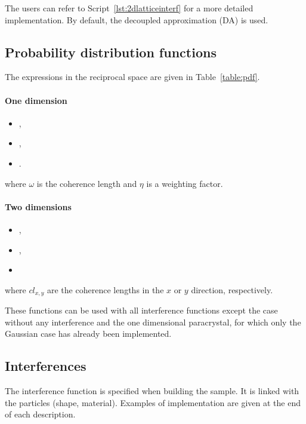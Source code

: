 The users can refer to Script~\ref{lst:2dlatticeinterf} for a more detailed implementation. By default, the decoupled approximation (DA) is used.

\subsection{Probability distribution functions}\label{baftd}
The expressions in the reciprocal space are given in Table~\ref{table:pdf}.

\paragraph{One dimension}
\begin{itemize}
\item {},
\item {},
\item {}.
\end{itemize}
where $\omega$ is the coherence length and $\eta$ is a weighting factor.

\paragraph{Two dimensions}

\begin{itemize}
\item {},
\item {},
\item {}
\end{itemize}
where $cl_{x,y}$ are the coherence lengths in the $x$ or $y$ direction, respectively.

These functions can be used with all interference functions except the case without any interference and the one dimensional paracrystal, for which only the Gaussian case has already been implemented.
\subsection{Interferences}
The interference function is specified when building the sample. It is linked with the particles (shape, material). Examples of implementation are given at the end of each description.

